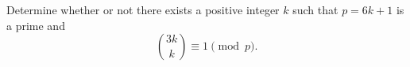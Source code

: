 Determine whether or not there exists a positive integer $k$ such that $p = 6k+1$ is a prime and \[\binom{3k}{k} \equiv 1  \pmod{p}.\]